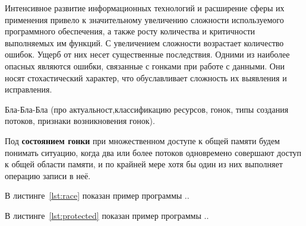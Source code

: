 \Introduction

Интенсивное развитие информационных технологий и расширение сферы их применения привело к значительному увеличению сложности используемого программного обеспечения, а также росту количества и критичности выполняемых им функций. С увеличением сложности возрастает количество ошибок. Ущерб от них несет существенные последствия. Одними из наиболее опасных являются ошибки, связанные с гонками при работе с данными. Они носят стохастический характер, что обуславливает сложность их выявления и исправления.

Бла-Бла-Бла (про актуальност,классификацию ресурсов, гонок, типы создания  потоков, признаки возникновения гонок).

Под \textbf{состоянием гонки} при множественном доступе к общей памяти будем понимать ситуацию, когда два или более потоков одновремено совершают доступ к общей области памяти, и по крайней мере хотя бы один из них выполняет операцию записи в неё. 





В листинге~\ref{lst:race} показан пример программы ..

В листинге~\ref{lst:protected} показан пример программы ..
